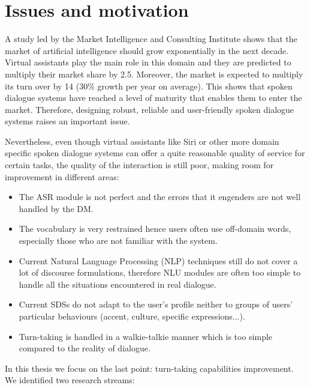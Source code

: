 \section{Issues and motivation}
    
    A study led by the Market Intelligence and Consulting Institute shows that the market of artificial intelligence should grow exponentially in the next decade. Virtual assistants play the main role in this domain and they are predicted to multiply their market share by 2.5. Moreover, the market is expected to multiply its turn over by 14 (30\% growth per year on average). This shows that spoken dialogue systems have reached a level of maturity that enables them to enter the market. Therefore, designing robust, reliable and user-friendly spoken dialogue systems raises an important issue.
    
    Nevertheless, even though virtual assistants like Siri or other more domain specific spoken dialogue systems can offer a quite reasonable quality of service for certain tasks, the quality of the interaction is still poor, making room for improvement in different areas:
    
    \begin{itemize}
    	\item The ASR module is not perfect and the errors that it engenders are not well handled by the DM.
        \item The vocabulary is very restrained hence users often use off-domain words, especially those who are not familiar with the system.
        \item Current Natural Language Processing (NLP) techniques still do not cover a lot of discourse formulations, therefore NLU modules are often too simple to handle all the situations encountered in real dialogue.
        \item Current SDSs do not adapt to the user's profile neither to groups of users' particular behaviours (accent, culture, specific expressions...).
        \item Turn-taking is handled in a walkie-talkie manner which is too simple compared to the reality of dialogue.
    \end{itemize}
    
    In this thesis we focus on the last point: turn-taking capabilities improvement. We identified two research streams:
    
